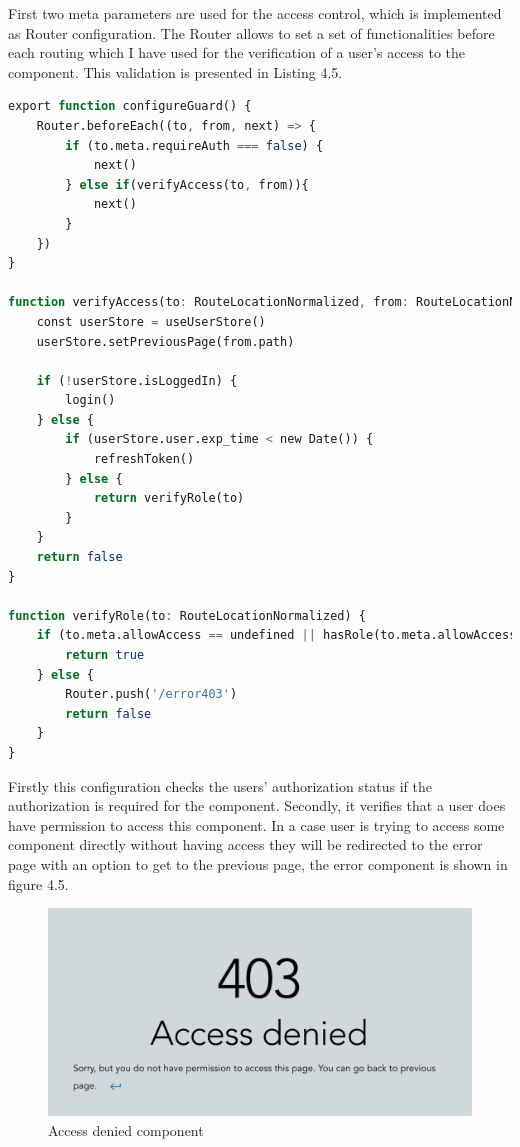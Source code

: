 \noindent First two meta parameters are used for the access control, which is implemented as Router configuration. The Router allows to set a set of functionalities before each routing which I have used for the verification of a user's access to the component. This validation is presented in Listing 4.5.


\begin{lstlisting}[language=Octave, caption=Validation of access by role]
export function configureGuard() {
    Router.beforeEach((to, from, next) => {
        if (to.meta.requireAuth === false) {
            next()
        } else if(verifyAccess(to, from)){
            next()
        }
    })
}

function verifyAccess(to: RouteLocationNormalized, from: RouteLocationNormalized) {
    const userStore = useUserStore()
    userStore.setPreviousPage(from.path)
        
    if (!userStore.isLoggedIn) {
        login()
    } else {
        if (userStore.user.exp_time < new Date()) {
            refreshToken()
        } else {
            return verifyRole(to)
        }
    }
    return false
}

function verifyRole(to: RouteLocationNormalized) {
    if (to.meta.allowAccess == undefined || hasRole(to.meta.allowAccess as Role)) {
        return true
    } else {
        Router.push('/error403')
        return false
    }
}
\end{lstlisting}

\noindent Firstly this configuration checks the users' authorization status if the authorization is required for the component. Secondly, it verifies that a user does have permission to access this component. In a case user is trying to access some component directly without having access they will be redirected to the error page with an option to get to the previous page, the error component is shown in figure 4.5.

\begin{figure}[hp]
\centering
\includegraphics[scale=0.5]{../png/access_denied.png}
\caption{Access denied component}
\end{figure}



